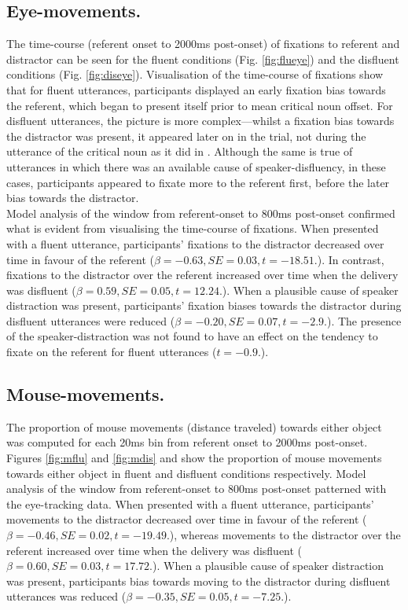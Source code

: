 \documentclass[man]{apa6}
\begin{document}
\subsection{Eye-movements.}

The time-course (referent onset to 2000ms post-onset) of fixations to referent and distractor can be seen for the fluent conditions (Fig. \ref{fig:flueye}) and the disfluent conditions (Fig. \ref{fig:diseye}). 
Visualisation of the time-course of fixations show that for fluent utterances, participants displayed an early fixation bias towards the referent, which began to present itself prior to mean critical noun offset. 
For disfluent utterances, the picture is more complex---whilst a fixation bias towards the distractor was present, it appeared later on in the trial, not during the utterance of the critical noun as it did in \citet{Loy2016}. 
Although the same is true of utterances in which there was an available cause of speaker-disfluency, in these cases, participants appeared to fixate more to the referent first, before the later bias towards the distractor.\\

Model analysis of the window from referent-onset to 800ms post-onset confirmed what is evident from visualising the time-course of fixations. 
When presented with a fluent utterance, participants' fixations to the distractor decreased over time in favour of the referent ($\beta = -0.63, SE = 0.03, t=-18.51.$). 
In contrast, fixations to the distractor over the referent increased over time when the delivery was disfluent ($\beta = 0.59, SE = 0.05, t=12.24.$). 
When a plausible cause of speaker distraction was present, participants' fixation biases towards the distractor during disfluent utterances were reduced ($\beta = -0.20, SE = 0.07, t=-2.9.$). 
The presence of the speaker-distraction was not found to have an effect on the tendency to fixate on the referent for fluent utterances ($t=-0.9.$).\\

\subsection{Mouse-movements.}
The proportion of mouse movements (distance traveled) towards either object was computed for each 20ms bin from referent onset to 2000ms post-onset. 
Figures \ref{fig:mflu} and \ref{fig:mdis} and show the proportion of mouse movements towards either object in fluent and disfluent conditions respectively. 
Model analysis of the window from referent-onset to 800ms post-onset patterned with the eye-tracking data. 
When presented with a fluent utterance, participants' movements to the distractor decreased over time in favour of the referent ($\beta = -0.46, SE = 0.02, t=-19.49.$), whereas movements to the distractor over the referent increased over time when the delivery was disfluent ($\beta = 0.60, SE = 0.03, t=17.72.$). 
When a plausible cause of speaker distraction was present, participants bias towards moving to the distractor during disfluent utterances was reduced ($\beta = -0.35, SE = 0.05, t=-7.25.$).\\
\end{document}
